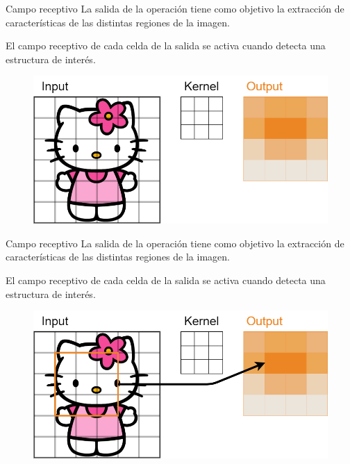 \begin{frame}{Campo receptivo}
La salida de la \alert{operación} tiene como objetivo la \alert{extracción de características} de las distintas \alert{regiones de la imagen}.

El \alert{campo receptivo} de cada celda de la salida se \alert{activa} cuando detecta una \alert{estructura de interés}.

\begin{figure}
    \centering
    \includegraphics[width=\textwidth]{Slides/figures/Tema 3/ReceptiveActivation.png}
\end{figure}
\end{frame}

\begin{frame}{Campo receptivo}
La salida de la \alert{operación} tiene como objetivo la \alert{extracción de características} de las distintas \alert{regiones de la imagen}.

El \alert{campo receptivo} de cada celda de la salida se \alert{activa} cuando detecta una \alert{estructura de interés}.

\begin{figure}
    \centering
    \includegraphics[width=\textwidth]{Slides/figures/Tema 3/ReceptiveActivation_1.png}
\end{figure}
\end{frame}

